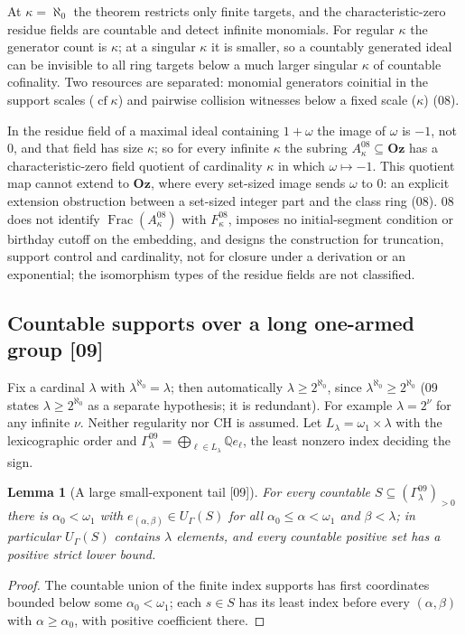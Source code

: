 \documentclass[11pt,letterpaper]{article}
\numberwithin{equation}{section}
\newtheorem{lemma}[lemma]{Lemma}
\theoremstyle{definition}
\theoremstyle{remark}
\theoremstyle{plain}
\newcommand{\Oz}{\mathbf{Oz}}
\newcommand{\Q}{\mathbb Q}
\newcommand{\Frac}{\operatorname{Frac}}
\newcommand{\cf}{\operatorname{cf}}
\newcommand{\src}[1]{\textup{\textsf{[#1]}}}
\begin{document}
At $\kappa=\aleph_0$ the theorem restricts only finite targets, and the characteristic-zero residue fields are
countable and detect infinite monomials. For regular $\kappa$ the generator count is $\kappa$; at a singular
$\kappa$ it is smaller, so a countably generated ideal can be invisible to all ring targets below a much larger
singular $\kappa$ of countable cofinality. Two resources are separated: monomial generators coinitial in the
support scales ($\cf\kappa$) and pairwise collision witnesses below a fixed scale ($\kappa$) (08).

In the residue field of a maximal ideal containing $1+\omega$ the image of $\omega$ is $-1$, not $0$, and that
field has size $\kappa$; so for every infinite $\kappa$ the subring $A^{08}_\kappa\subseteq\Oz$ has a
characteristic-zero field quotient of cardinality $\kappa$ in which $\omega\mapsto-1$. This quotient map cannot
extend to $\Oz$, where every set-sized image sends $\omega$ to $0$: an explicit extension obstruction between a
set-sized integer part and the class ring (08). 08 does not identify $\Frac(A^{08}_\kappa)$ with
$F^{08}_\kappa$, imposes no initial-segment condition or birthday cutoff on the embedding, and designs the
construction for truncation, support control and cardinality, not for closure under a derivation or an
exponential; the isomorphism types of the residue fields are not classified.

\subsection{Countable supports over a long one-armed group \texorpdfstring{\src{09}}{[09]}}\label{osq:sub:model09}

Fix a cardinal $\lambda$ with $\lambda^{\aleph_0}=\lambda$; then automatically $\lambda\ge2^{\aleph_0}$,
since $\lambda^{\aleph_0}\ge2^{\aleph_0}$ (09 states $\lambda\ge2^{\aleph_0}$ as a separate hypothesis; it is
redundant). For example $\lambda=2^\nu$ for any infinite $\nu$. Neither regularity nor CH is assumed. Let
$L_\lambda=\omega_1\times\lambda$ with the lexicographic order and
$\Gamma^{09}_\lambda=\bigoplus_{\ell\in L_\lambda}\Q e_\ell$, the least nonzero index deciding the sign.

\begin{lemma}[A large small-exponent tail \src{09}]\label{osq:lem:tail}
For every countable $S\subseteq(\Gamma^{09}_\lambda)_{>0}$ there is $\alpha_0<\omega_1$ with
$e_{(\alpha,\beta)}\in U_{\Gamma}(S)$ for all $\alpha_0\le\alpha<\omega_1$ and $\beta<\lambda$; in particular
$U_\Gamma(S)$ contains $\lambda$ elements, and every countable positive set has a positive strict lower bound.
\end{lemma}
\begin{proof}
The countable union of the finite index supports has first coordinates bounded below some $\alpha_0<\omega_1$;
each $s\in S$ has its least index before every $(\alpha,\beta)$ with $\alpha\ge\alpha_0$, with positive
coefficient there.
\end{proof}
\end{document}
